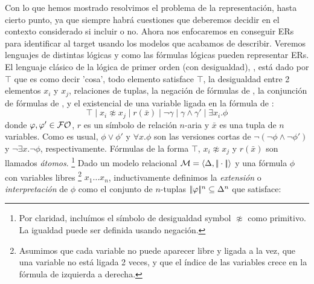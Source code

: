 Con lo que hemos mostrado resolvimos el problema de la representaci\'on, hasta cierto punto, ya que siempre habr\'a cuestiones que deberemos decidir en el contexto considerado si incluir o no. Ahora nos enfocaremos en conseguir ERs para identificar al target usando los modelos que acabamos de describir. Veremos lenguajes de distintas l\'ogicas y como las f\'ormulas l\'ogicas pueden representar ERs.
El lenguaje cl\'asico de la l\'ogica de primer orden (con desigualdad), \FOL, est\'a dado por $\top$ que es como decir 'cosa', todo elemento satisface $\top$, la desigualdad entre 2 elementos $ x_i$ y $x_j$, relaciones de tuplas, la negaci\'on de f\'ormulas de \FOL, la conjunci\'on de f\'ormulas de \FOL, y el existencial de una variable ligada en la f\'ormula de \FOL:
$$
  \top \mid x_i \not\approx x_j \mid  r (\bar x) \mid \lnot \gamma \mid \gamma \land \gamma' \mid \exists x_i . \phi
$$
%
donde $\varphi,\varphi' \in \mathcal{FO}$,
$r$ es un s\'imbolo de relaci\'on $n$-aria y $\bar x$ es una tupla de $n$ variables.
Como es usual, $\phi \lor \phi'$ y $\forall x . \phi$ son las versiones cortas de
$\lnot(\lnot\phi \land \lnot\phi')$ y $\lnot\exists x . \lnot\phi$, respectivamente.
F\'ormulas de la forma $\top$, $x_i \not\approx x_j$ y $r(\bar
x)$ son llamados \emph{\'atomos}.%
  \footnote{%
    Por claridad, inclu\'imos el s\'imbolo de desigualdad symbol $\not \approx$ como
    primitivo. La igualdad puede ser definida usando negaci\'on.
  }
Dado un modelo relacional $\mathcal{M} = \langle \Delta,|\!|\cdot|\!| \rangle$ y una
f\'ormula $\phi$ con variables libres%
\footnote{%
    Asumimos que cada variable no puede aparecer libre y ligada a la vez, que una variable no est\'a ligada 2 veces,
    y que el \'indice de las variables crece en la f\'ormula de izquierda a derecha.%
}
$x_1\ldots x_n$, inductivamente definimos la \emph{extensi\'on} o
\emph{interpretaci\'on} de $\phi$ como el conjunto de $n$-tuplas
 $|\!|\varphi|\!|^n \subseteq \Delta^n$ que satisface:

